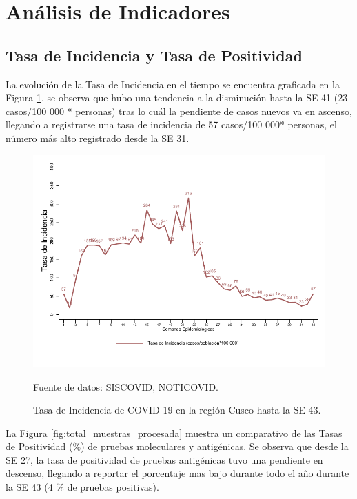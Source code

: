 \documentclass[12pt,a4paper,openany]{book}
\begin{document}

\clearpage

    \section*{Análisis de Indicadores}
   	\subsection*{Tasa de Incidencia y Tasa de Positividad}
\noindent La evolución de la Tasa de Incidencia en el tiempo se encuentra graficada en la Figura \ref{fig:incidencia}, se observa que hubo una tendencia a la disminución hasta la SE 41 (23 casos/100 000 * personas) tras lo cuál la pendiente de casos nuevos va en ascenso, llegando a registrarse una tasa de incidencia de 57 casos/100 000* personas, el número más alto registrado desde la SE 31.

   \begin{figure}[h]
   	\caption{Tasa de Incidencia de COVID-19 en la región Cusco hasta la SE 43. }\label{fig:incidencia}
   	\begin{center}
   		\includegraphics[width=0.65\linewidth]{../figuras/tasa_incidencia}
   	\end{center}
   	{\footnotesize {Fuente de datos: SISCOVID, NOTICOVID.}}
   \end{figure}
   
   La Figura \ref{fig:total_muestras_procesada} muestra un comparativo de las Tasas de Positividad ($\%$) de pruebas moleculares y antigénicas. Se observa que desde la SE 27, la tasa de positividad de pruebas antigénicas tuvo una pendiente en descenso, llegando a reportar el porcentaje mas bajo durante todo el año durante la SE 43 (4 $\%$ de pruebas positivas). 
   
\end{document}
